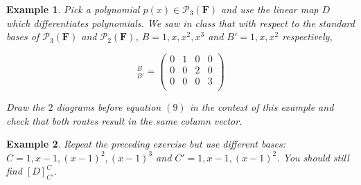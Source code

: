 \documentclass{article}
\theoremstyle{problemstyle}
\newtheorem{example}{Example}
\begin{document}
\begin{example}
Pick a polynomial $p(x) \in \mathcal{P}_3(\textbf{F})$ and use the linear map $D$ which differentiates polynomials. We saw in class that with respect to the standard bases of  $\mathcal{P}_3(\textbf{F})$ and $\mathcal{P}_2(\textbf{F})$, $B = 1,x,x^2,x^3$ and $B' = 1,x,x^2$ respectively,  

\begin{equation}
[D]_{B'}^B = 
\begin{pmatrix} 0 & 1& 0 & 0  \\
 0 & 0& 2 & 0  \\
  0 & 0& 0 & 3  \\
\end{pmatrix}
\end{equation}

Draw the $2$ diagrams before equation $(9)$ in the context of this example and check that both routes result in the same column vector.  
\end{example}

\begin{example}
Repeat the preceding exercise but use different bases: $C = 1,x-1,(x-1)^2,(x-1)^3$ and $C' = 1,x-1,(x-1)^2$. You should still find $[D]_{C'}^C$. 
\end{example}
\end{document}
